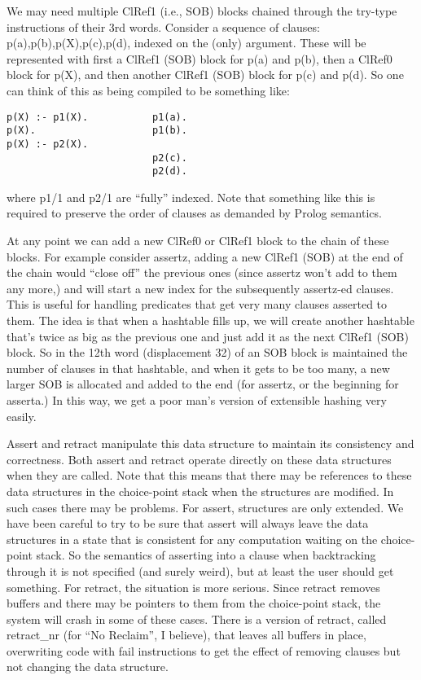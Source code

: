 \documentclass[11pt]{article}
\begin{document}
We may need multiple ClRef1 (i.e., SOB) blocks chained through the
try-type instructions of their 3rd words.  Consider a sequence of
clauses: p(a),p(b),p(X),p(c),p(d), indexed on the (only) argument.
These will be represented with first a ClRef1 (SOB) block for p(a) and
p(b), then a ClRef0 block for p(X), and then another ClRef1 (SOB)
block for p(c) and p(d).  So one can think of this as being compiled
to be something like:
\begin{verbatim}
p(X) :- p1(X).           p1(a).
p(X).                    p1(b).
p(X) :- p2(X).
                         p2(c).
                         p2(d).
\end{verbatim}
where p1/1 and p2/1 are ``fully'' indexed.  Note that something like
this is required to preserve the order of clauses as demanded by Prolog
semantics.

At any point we can add a new ClRef0 or ClRef1 block to the chain of
these blocks.  For example consider assertz, adding a new ClRef1 (SOB)
at the end of the chain would ``close off'' the previous ones (since
assertz won't add to them any more,) and will start a new index for the
subsequently assertz-ed clauses.  This is useful for handling
predicates that get very many clauses asserted to them.  The idea is
that when a hashtable fills up, we will create another hashtable
that's twice as big as the previous one and just add it as the next
ClRef1 (SOB) block.  So in the 12th word (displacement 32) of an SOB
block is maintained the number of clauses in that hashtable, and when
it gets to be too many, a new larger SOB is allocated and added to the
end (for assertz, or the beginning for asserta.)  In this way, we get
a poor man's version of extensible hashing very easily.

Assert and retract manipulate this data structure to maintain its
consistency and correctness.  Both assert and retract operate directly
on these data structures when they are called.  Note that this means
that there may be references to these data structures in the
choice-point stack when the structures are modified.  In such cases
there may be problems.  For assert, structures are only extended.  We
have been careful to try to be sure that assert will always leave the
data structures in a state that is consistent for any computation
waiting on the choice-point stack.  So the semantics of asserting into
a clause when backtracking through it is not specified (and surely
weird), but at least the user should get something.  For retract, the
situation is more serious.  Since retract removes buffers and there
may be pointers to them from the choice-point stack, the system will
crash in some of these cases.  There is a version of retract, called
retract\_nr (for ``No Reclaim'', I believe), that leaves all buffers in
place, overwriting code with fail instructions to get the effect of
removing clauses but not changing the data structure.
\end{document}
